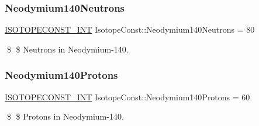 \subsubsection{\texorpdfstring{Neodymium140\+Neutrons}{Neodymium140Neutrons}}
{\footnotesize\ttfamily \mbox{\hyperlink{group___isotope_const-_macros_ga5f18360b3e99483a35c32d789e62621c}{I\+S\+O\+T\+O\+P\+E\+C\+O\+N\+S\+T\+\_\+\+I\+NT}} Isotope\+Const\+::\+Neodymium140\+Neutrons = 80}

\$ \$ Neutrons in Neodymium-\/140. \mbox{\label{group___isotope_const-_neodymium-_nd140_gad70b95fc297d441747f401656e0e123c}} 
\subsubsection{\texorpdfstring{Neodymium140\+Protons}{Neodymium140Protons}}
{\footnotesize\ttfamily \mbox{\hyperlink{group___isotope_const-_macros_ga5f18360b3e99483a35c32d789e62621c}{I\+S\+O\+T\+O\+P\+E\+C\+O\+N\+S\+T\+\_\+\+I\+NT}} Isotope\+Const\+::\+Neodymium140\+Protons = 60}

\$ \$ Protons in Neodymium-\/140. 